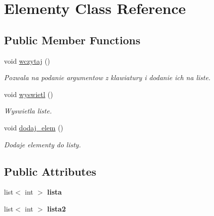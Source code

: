 \hypertarget{class_elementy}{\section{\-Elementy \-Class \-Reference}
\label{class_elementy}
}
\subsection*{\-Public \-Member \-Functions}
\begin{DoxyCompactItemize}
\item 
void \hyperlink{class_elementy_a8af01939789a62fc5b6ef0d49a55fa9b}{wczytaj} ()
\begin{DoxyCompactList}\small\item\em \-Pozwala na podanie argumentow z klawiatury i dodanie ich na liste. \end{DoxyCompactList}\item 
void \hyperlink{class_elementy_afd5ca1e819debb9e1cc8b83f958140c4}{wyswietl} ()
\begin{DoxyCompactList}\small\item\em \-Wyswietla liste. \end{DoxyCompactList}\item 
void \hyperlink{class_elementy_a97ecc260bc0143fb5fb5b10c8aa30d9c}{dodaj\-\_\-elem} ()
\begin{DoxyCompactList}\small\item\em \-Dodaje elementy do listy. \end{DoxyCompactList}\end{DoxyCompactItemize}
\subsection*{\-Public \-Attributes}
\begin{DoxyCompactItemize}
\item 
\hypertarget{class_elementy_aed0552cb9945091aae4dfe7887200913}{list$<$ int $>$ {\bfseries lista}}\label{class_elementy_aed0552cb9945091aae4dfe7887200913}

\item 
\hypertarget{class_elementy_aea10029915b1f8426b7a26727049ff1e}{list$<$ int $>$ {\bfseries lista2}}\label{class_elementy_aea10029915b1f8426b7a26727049ff1e}

\end{DoxyCompactItemize}


